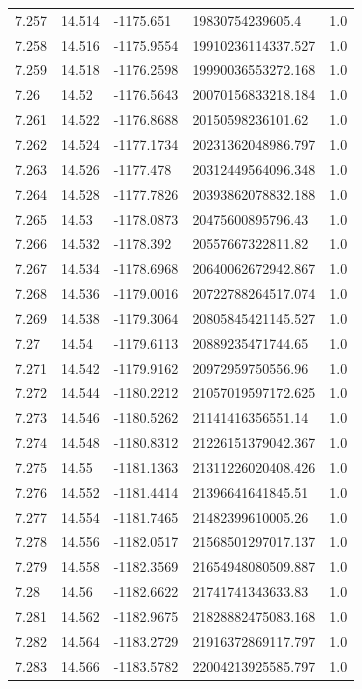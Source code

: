 \begin{tabular}{lllll}
7.257 & 14.514 & -1175.651 & 19830754239605.4 & 1.0 \\
7.258 & 14.516 & -1175.9554 & 19910236114337.527 & 1.0 \\
7.259 & 14.518 & -1176.2598 & 19990036553272.168 & 1.0 \\
7.26 & 14.52 & -1176.5643 & 20070156833218.184 & 1.0 \\
7.261 & 14.522 & -1176.8688 & 20150598236101.62 & 1.0 \\
7.262 & 14.524 & -1177.1734 & 20231362048986.797 & 1.0 \\
7.263 & 14.526 & -1177.478 & 20312449564096.348 & 1.0 \\
7.264 & 14.528 & -1177.7826 & 20393862078832.188 & 1.0 \\
7.265 & 14.53 & -1178.0873 & 20475600895796.43 & 1.0 \\
7.266 & 14.532 & -1178.392 & 20557667322811.82 & 1.0 \\
7.267 & 14.534 & -1178.6968 & 20640062672942.867 & 1.0 \\
7.268 & 14.536 & -1179.0016 & 20722788264517.074 & 1.0 \\
7.269 & 14.538 & -1179.3064 & 20805845421145.527 & 1.0 \\
7.27 & 14.54 & -1179.6113 & 20889235471744.65 & 1.0 \\
7.271 & 14.542 & -1179.9162 & 20972959750556.96 & 1.0 \\
7.272 & 14.544 & -1180.2212 & 21057019597172.625 & 1.0 \\
7.273 & 14.546 & -1180.5262 & 21141416356551.14 & 1.0 \\
7.274 & 14.548 & -1180.8312 & 21226151379042.367 & 1.0 \\
7.275 & 14.55 & -1181.1363 & 21311226020408.426 & 1.0 \\
7.276 & 14.552 & -1181.4414 & 21396641641845.51 & 1.0 \\
7.277 & 14.554 & -1181.7465 & 21482399610005.26 & 1.0 \\
7.278 & 14.556 & -1182.0517 & 21568501297017.137 & 1.0 \\
7.279 & 14.558 & -1182.3569 & 21654948080509.887 & 1.0 \\
7.28 & 14.56 & -1182.6622 & 21741741343633.83 & 1.0 \\
7.281 & 14.562 & -1182.9675 & 21828882475083.168 & 1.0 \\
7.282 & 14.564 & -1183.2729 & 21916372869117.797 & 1.0 \\
7.283 & 14.566 & -1183.5782 & 22004213925585.797 & 1.0 \\

\end{tabular}
